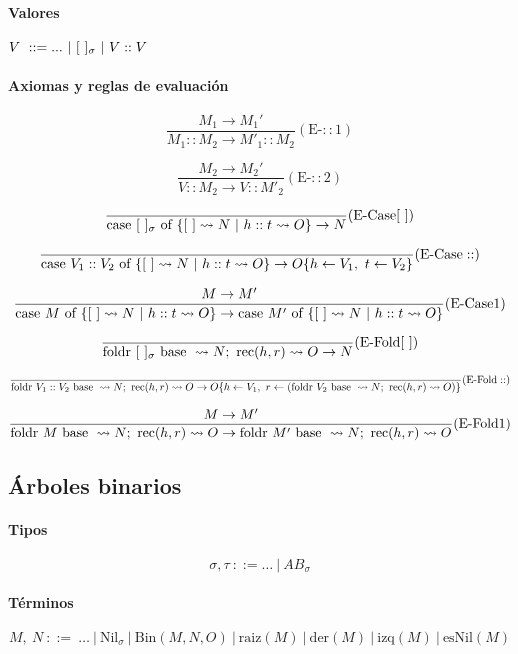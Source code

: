 \paragraph{Valores}
$V~::= ...~|~[~]_{\sigma}~|~V::V$

\paragraph{Axiomas y reglas de evaluación}
\begin{multicols}{2}
	$$\frac{M_1\to M_1'}{M_1 :: M_2 \to M'_1::M_2}(\text{E-}::\text{1})$$
	
	\vspace*{5mm}
	$$\frac{M_2\to M_2'}{V :: M_2 \to V::M'_2}(\text{E-}::\text{2})$$
	
	\vspace*{5mm}
	$$\frac{}{\text{case } [~]_{\sigma} \text{ of } \{[~]\leadsto N~|~h::t\leadsto O\}\to N}(\text{E-Case}[~])$$
	
\end{multicols}
	\vspace*{5mm}
$$\frac{}{\text{case } V_1::V_2 \text{ of } \{[~]\leadsto N~|~h::t\leadsto O\}\to O\{h\leftarrow V_1,~t\leftarrow V_2\}}(\text{E-Case}::)$$

\vspace*{5mm}
$$\frac{M\to M'}{\text{case } M \text{ of } \{[~]\leadsto N~|~h::t\leadsto O\}\to\text{case } M' \text{ of } \{[~]\leadsto N~|~h::t\leadsto O\}}(\text{E-Case}\text{1})$$

\vspace*{5mm}
$$\frac{}{\text{foldr } [~]_{\sigma} \text{ base }\leadsto N;~\text{rec}(h, r)\leadsto O\to N}(\text{E-Fold}[~])$$

\vspace*{5mm}
$$\frac{}{\text{foldr } V_1::V_2 \text{ base }\leadsto N;~\text{rec}(h, r)\leadsto O\to O\{h\leftarrow V_1,~r\leftarrow(\text{foldr } V_2 \text{ base }\leadsto N;~\text{rec}(h, r)\leadsto O)\}}(\text{E-Fold}::)$$

\vspace*{5mm}
$$\frac{M\to M'}{\text{foldr } M \text{ base }\leadsto N;~\text{rec}(h, r)\leadsto O\to\text{foldr } M' \text{ base }\leadsto N;~\text{rec}(h, r)\leadsto O}(\text{E-Fold}\text{1})$$


\subsection{Árboles binarios}

\paragraph{Tipos}
$$\sigma,\tau~::= \dots~|~AB_\sigma$$

\paragraph{Términos}
$$M,~N~::=~\dots~|~\text{Nil}_\sigma~|~\text{Bin}(M, N, O)~|~\text{raiz}(M)~|~\text{der}(M)~|~\text{izq}(M)~|~\text{esNil}(M)$$
